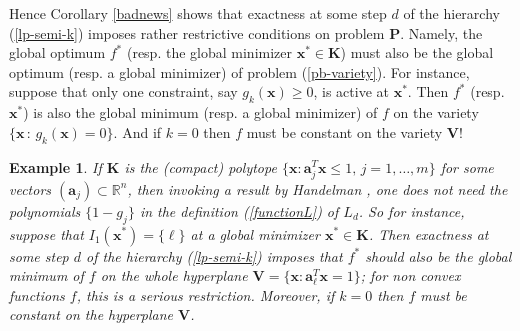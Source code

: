 \documentclass[11pt]{article}
\newtheorem{example}{Example}
\numberwithin{equation}{section}
\def\x{\mathbf{x}}
\def\R{\mathbb{R}}
\def\K{\mathbf{K}}
\def\P{\mathbf{P}}
\def\V{\mathbf{V}}
\def\a{\mathbf{a}}
\begin{document}
Hence Corollary \ref{badnews} shows that
exactness at some step $d$ of the hierarchy (\ref{lp-semi-k}) imposes rather restrictive conditions on problem $\P$.
Namely, the global optimum $f^*$ (resp. the global minimizer $\x^*\in\K$) must also be the global optimum
(resp. a global minimizer) of problem (\ref{pb-variety}). For instance, suppose that
only one constraint, say $g_k(\x)\geq0$, is active at $\x^*$. Then $f^*$ (resp. $\x^*$) is also the global minimum 
(resp. a global minimizer) of $f$ on the variety 
$\{\x\,:\,g_k(\x)=0\}$.  And if $k=0$ then $f$ must be constant on the variety $\V$!

\begin{example} If $\K$ is the (compact) polytope $\{\x: \a_j^T \x\leq 1,\,j=1,\ldots,m\}$ for some vectors
$(\a_j)\subset\R^n$, then invoking a result by Handelman \cite{Handelman88}, one does not need the polynomials $\{1-g_j\}$ in the definition
(\ref{functionL}) of $L_d$. So for instance, suppose that $I_1(\x^*)=\{\ell\}$
at a global minimizer $\x^*\in\K$.
Then exactness at some step $d$ of the hierarchy (\ref{lp-semi-k}) imposes that $f^*$ should also be the global minimum of
$f$ on the whole hyperplane $\V=\{\x: \a_\ell^T\x=1\}$; for non convex functions $f$,
this is a serious restriction. Moreover, if $k=0$ then $f$ must be constant on the hyperplane $\V$. 
\end{example}
\end{document}
